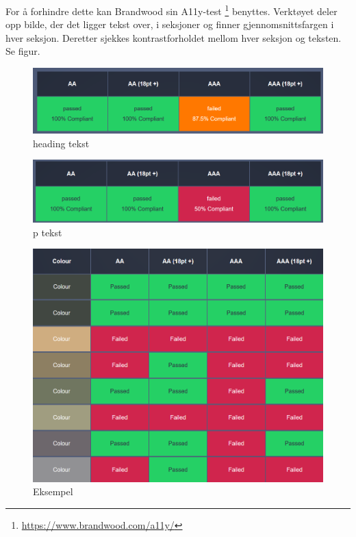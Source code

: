 For å forhindre dette kan Brandwood sin A11y-test \footnote{\url{https://www.brandwood.com/a11y/}} benyttes. Verktøyet deler opp bilde, der det ligger tekst over, i seksjoner og finner gjennomsnittsfargen i hver seksjon. Deretter sjekkes kontrastforholdet mellom hver seksjon og teksten.
Se figur.

\begin{figure}[H]
    \centering
    \includegraphics[width=\textwidth]{bjornar/bg-image-h1.png}
    \caption{heading tekst}
    \label{fig:analysis-current-a11y_bg-h1}
\end{figure}

\begin{figure}[H]
    \centering
    \includegraphics[width=\textwidth]{bjornar/bg-image-p.png}
    \caption{p tekst}
    \label{fig:analysis-current-a11y_bg-p}
\end{figure}

\begin{figure}[H]
    \centering
    \includegraphics[width=\textwidth]{bjornar/bg-image-eksempel.png}
    \caption{Eksempel}
    \label{fig:analysis-current-a11y_bg-example}
\end{figure}


